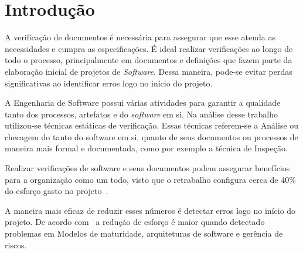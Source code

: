 \chapter{Introdução}

A verificação de documentos é necessária para assegurar que esse atenda as necessidades e cumpra as especificações. É ideal realizar verificações ao longo de todo o processo, principalmente em documentos e definições que fazem parte da elaboração inicial de projetos de \textit{Software}. Dessa maneira, pode-se evitar perdas significativas ao identificar erros logo no início do projeto.

A Engenharia de Software possui várias atividades para garantir a qualidade tanto dos processos, artefatos e do \textit{software} em si. Na análise desse trabalho utilizou-se técnicas estáticas de verificação. Essas técnicas referem-se a Análise ou checagem do tanto do software em si, quanto de seus documentos ou processos de maneira mais formal e documentada, como por exemplo a técnica de Inspeção.

Realizar verificações de software e seus documentos podem assegurar benefícios para a organização como um todo, visto que o retrabalho configura cerca de 40\% do esforço gasto no projeto~\cite{}. 

A maneira mais eficaz de reduzir esses números é detectar erros logo no início do projeto. De acordo com~\cite{} a redução de esforço é maior quando detectado problemas em Modelos de maturidade, arquiteturas de software e gerência de riscos. 

